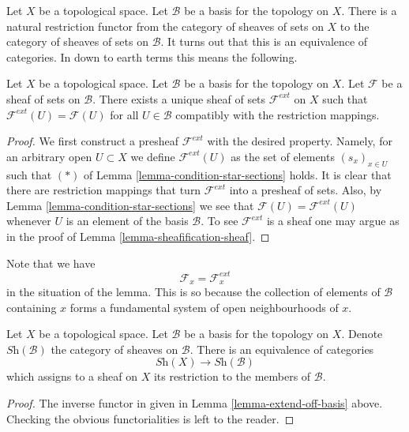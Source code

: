 \noindent
Let $X$ be a topological space.
Let $\mathcal{B}$ be a basis for the topology on $X$.
There is a natural restriction functor from the category
of sheaves of sets on $X$ to the category of sheaves of
sets on $\mathcal{B}$. It turns out that this is an equivalence
of categories. In down to earth terms this means the following.

\begin{lemma}
\label{lemma-extend-off-basis}
Let $X$ be a topological space.
Let $\mathcal{B}$ be a basis for the topology on $X$.
Let $\mathcal{F}$ be a sheaf of sets on $\mathcal{B}$.
There exists a unique sheaf of sets $\mathcal{F}^{ext}$
on $X$ such that $\mathcal{F}^{ext}(U) = \mathcal{F}(U)$
for all $U \in \mathcal{B}$ compatibly with the restriction
mappings.
\end{lemma}

\begin{proof}
We first construct a presheaf $\mathcal{F}^{ext}$ with the
desired property. Namely, for an arbitrary open $U \subset X$ we
define $\mathcal{F}^{ext}(U)$ as the set of elements
$(s_x)_{x \in U}$ such that $(*)$ of
Lemma \ref{lemma-condition-star-sections} holds.
It is clear that there are restriction mappings
that turn $\mathcal{F}^{ext}$ into a presheaf of sets.
Also, by Lemma \ref{lemma-condition-star-sections} we
see that $\mathcal{F}(U) = \mathcal{F}^{ext}(U)$
whenever $U$ is an element of the basis $\mathcal{B}$.
To see $\mathcal{F}^{ext}$ is a sheaf one may
argue as in the proof of Lemma \ref{lemma-sheafification-sheaf}.
\end{proof}

\noindent
Note that we have
$$
\mathcal{F}_x = \mathcal{F}_x^{ext}
$$
in the situation of the lemma. This is so because the
collection of elements of $\mathcal{B}$ containing
$x$ forms a fundamental system of open neighbourhoods of $x$.

\begin{lemma}
\label{lemma-restrict-basis-equivalence}
Let $X$ be a topological space.
Let $\mathcal{B}$ be a basis for the topology on $X$.
Denote $\textit{Sh}(\mathcal{B})$ the category of
sheaves on $\mathcal{B}$.
There is an equivalence of categories
$$
\textit{Sh}(X) \longrightarrow \textit{Sh}(\mathcal{B})
$$
which assigns to a sheaf on $X$ its restriction to
the members of $\mathcal{B}$.
\end{lemma}

\begin{proof}
The inverse functor in given in Lemma \ref{lemma-extend-off-basis} above.
Checking the obvious functorialities is left to the
reader.
\end{proof}


